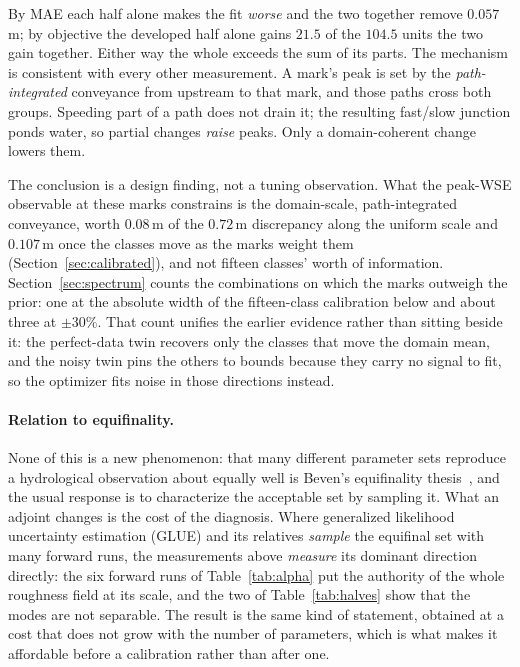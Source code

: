 \documentclass[11pt]{article}
\begin{document}
By MAE each half alone makes the fit \emph{worse} and the two together
remove $0.057$\,m; by objective the developed half alone gains $21.5$
of the $104.5$ units the two gain together. Either way the whole
exceeds the sum of its parts. The mechanism is consistent with every
other measurement. A mark's peak is set by the \emph{path-integrated}
conveyance from upstream to that mark, and those paths cross both
groups. Speeding part of a path does not drain it; the resulting
fast/slow junction ponds water, so partial changes \emph{raise} peaks.
Only a domain-coherent change lowers them.

The conclusion is a design finding, not a tuning observation. What
the peak-WSE observable at these marks constrains is the domain-scale,
path-integrated conveyance, worth $0.08$\,m of the $0.72$\,m
discrepancy along the uniform scale and $0.107$\,m once the classes
move as the marks weight them (Section~\ref{sec:calibrated}), and not
fifteen classes' worth of information.
Section~\ref{sec:spectrum} counts the combinations on which the marks
outweigh the prior: one at the absolute width of the fifteen-class
calibration below and about three at $\pm 30\%$. That count unifies
the earlier evidence rather than sitting beside it: the perfect-data twin recovers only the classes
that move the domain mean, and the noisy twin pins the others to
bounds because they carry no signal to fit, so the optimizer fits
noise in those directions instead.

\paragraph{Relation to equifinality.}
None of this is a new phenomenon: that many different parameter sets
reproduce a hydrological observation about equally well is Beven's
equifinality thesis~\cite{beven1992glue,beven2006equifinality}, and the
usual response is to characterize the acceptable set by sampling it.
What an adjoint changes is the cost of the diagnosis. Where
generalized likelihood uncertainty estimation (GLUE) and its relatives
\emph{sample} the equifinal set with many forward runs, the
measurements above \emph{measure} its dominant direction directly:
the six forward runs of Table~\ref{tab:alpha} put the authority of
the whole roughness field at its scale, and the two of
Table~\ref{tab:halves} show that the modes are not separable. The result
is the same kind of statement, obtained at a cost that does not grow
with the number of parameters, which is what makes it affordable
before a calibration rather than after one.
\end{document}
